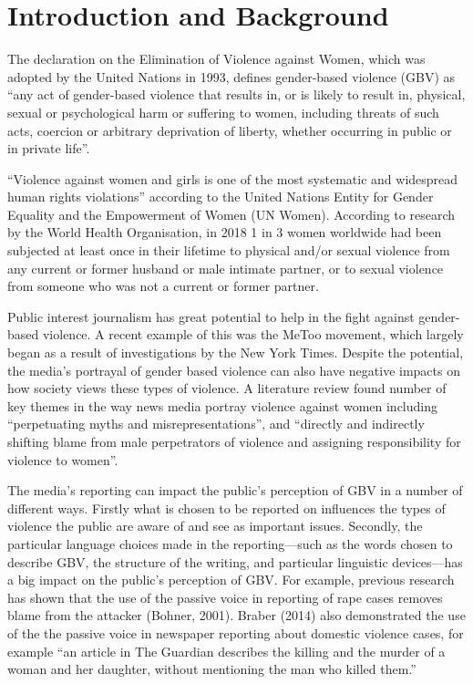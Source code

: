 \documentclass{article}
\begin{document}
\newpage
\section{Introduction and Background}{
	
The declaration on the Elimination of Violence against Women, which was adopted by the United Nations in 1993, defines gender-based violence (GBV) as “any act of gender-based violence that results in, or is likely to result in, physical, sexual or psychological harm or suffering to women, including threats of such acts, coercion or arbitrary deprivation of liberty, whether occurring in public or in private life”. 

“Violence against women and girls is one of the most systematic and widespread human rights violations” according to the United Nations Entity for Gender Equality and the Empowerment of Women (UN Women). According to research by the World Health Organisation, in 2018 1 in 3 women worldwide had been subjected at least once in their lifetime to physical and/or sexual violence from any current or former husband or male intimate partner, or to sexual violence from someone who was not a current or former partner. 

Public  interest  journalism has great potential to help in the fight against  gender-based violence. A recent example of this was the MeToo movement, which largely began as a result of investigations by the New York Times. Despite the potential, the media’s portrayal of gender based violence can also have negative impacts on how society views these types of violence. A literature review found number of key themes in the way news media portray violence against women including “perpetuating myths and misrepresentations”, and “directly and indirectly shifting blame from male perpetrators of violence and assigning responsibility for violence to women”.

The media’s reporting can impact the public’s perception of GBV in a number of different ways. Firstly what is chosen to be reported on influences the types of violence the public are aware of and see as important issues. Secondly, the particular language choices made in the reporting—such as the words chosen to describe GBV, the structure of the writing, and particular linguistic devices—has a big impact on the public’s perception of GBV. For example, previous research has shown that the use of the passive voice in reporting of rape cases removes blame from the attacker (Bohner, 2001). Braber (2014) also demonstrated the use of the the passive voice in newspaper reporting about domestic violence cases, for example “an article in The Guardian describes the killing and the murder of a woman and her daughter, without mentioning the man who killed them.”

}
\end{document}
